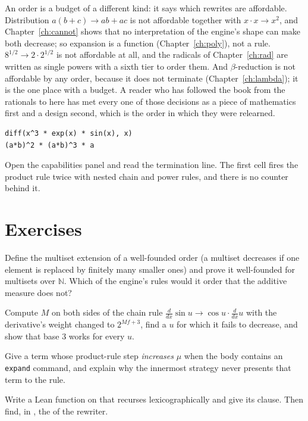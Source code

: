 An order is a budget of a different kind: it says which rewrites are affordable. Distribution
$a(b + c) \to ab + ac$ is not affordable together with $x \cdot x \to x^2$, and
Chapter~\ref{ch:cannot} shows that no interpretation of the engine's shape can make both
decrease; so expansion is a function (Chapter~\ref{ch:poly}), not a rule. $8^{1/2} \to 2 \cdot
2^{1/2}$ is not affordable at all, and the radicals of Chapter~\ref{ch:rad} are written as single
powers with a sixth tier to order them. And $\beta$-reduction is not affordable by any order,
because it does not terminate (Chapter~\ref{ch:lambda}); it is the one place with a budget. A
reader who has followed the book from the rationals to here has met every one of those decisions
as a piece of mathematics first and a design second, which is the order in which they were
relearned.

\begin{trybox}
\begin{verbatim}
diff(x^3 * exp(x) * sin(x), x)
(a*b)^2 * (a*b)^3 * a
\end{verbatim}
  Open the capabilities panel and read the termination line. The first cell fires the product
  rule twice with nested chain and power rules, and there is no counter behind it.
\end{trybox}

\section{Exercises}

\begin{exercisebox}
  Define the multiset extension of a well-founded order (a multiset decreases if one element is
  replaced by finitely many smaller ones) and prove it well-founded for multisets over $\mathbb{N}$.
  Which of the engine's rules would it order that the additive measure does not?
\end{exercisebox}

\begin{exercisebox}[Base 3]
  Compute $M$ on both sides of the chain rule $\frac{d}{dx}\sin u \to \cos u \cdot \frac{d}{dx} u$
  with the derivative's weight changed to $2^{M f + 3}$, find a $u$ for which it fails to
  decrease, and show that base $3$ works for every $u$.
\end{exercisebox}

\begin{exercisebox}
  Give a term whose product-rule step \emph{increases} $\mu$ when the body contains an
  \texttt{expand} command, and explain why the innermost strategy never presents that term to
  the rule.
\end{exercisebox}

\begin{exercisebox}
  Write a Lean function on  that recurses lexicographically and give its
   clause. Then find, in , the
   of the rewriter.
\end{exercisebox}
